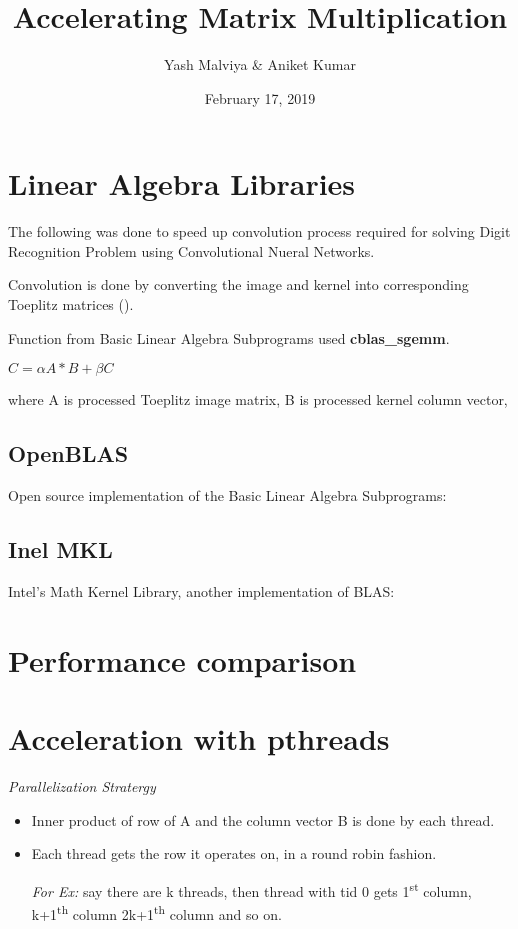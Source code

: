 \documentclass{article}
\author{Yash Malviya \& Aniket Kumar}
\title{Accelerating Matrix Multiplication}
\date{February 17, 2019}
\begin{document}
\maketitle

\section{Linear Algebra Libraries}

The following was done to speed up convolution process 
required for solving Digit Recognition Problem using 
Convolutional Nueral Networks. 

Convolution is done by converting the image and kernel 
into corresponding Toeplitz matrices
(\textcite{wiki:toepliz}).

Function from Basic Linear Algebra Subprograms used 
\textbf{cblas\_sgemm}.

\begin{math}
    C = \alpha A*B + \beta C
\end{math}

where A is processed Toeplitz image matrix,
B is processed kernel column vector,

\subsection{OpenBLAS}

Open source implementation of the 
Basic Linear Algebra Subprograms: \textcite{OpenBLAS:wiki} 

\subsection{Inel MKL}

Intel's Math Kernel Library, another 
implementation of BLAS: \textcite{IntelMKL:doc}

\section{Performance comparison}

\section{Acceleration with pthreads}

\emph{Parallelization Stratergy}

\begin{itemize}
    \item Inner product of row of A and the column vector B 
    is done by each thread.

    \item Each thread gets the row it operates on, in a 
    round robin fashion. 
    
    \textit{For Ex:} say there are k threads, then thread with 
    tid 0 gets 1\textsuperscript{st} column, k+1\textsuperscript{th} 
    column 2k+1\textsuperscript{th} column and so on.


\end{itemize}

\printbibliography
\end{document}

